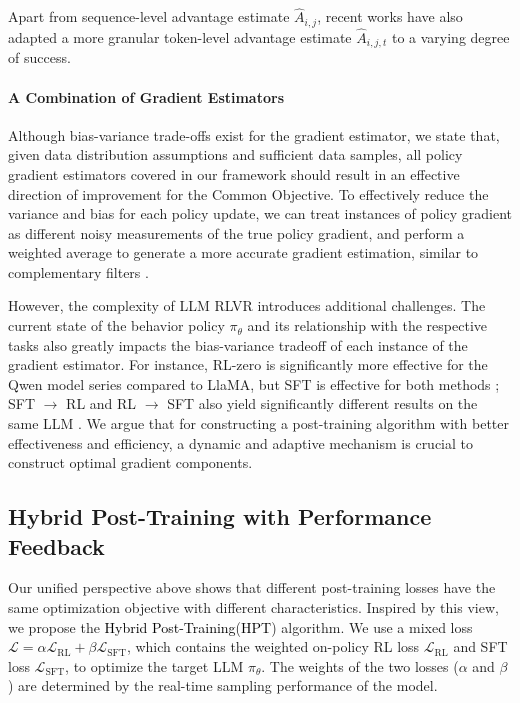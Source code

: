 \documentclass{article} %
\newcommand{\0}{\mathbb{0}}
\newcommand{\1}{\mathbb{1}}
\newcommand{\method}{\textcolor{black}{Hybrid Post-Training}\xspace}
\newcommand{\mot}{\textcolor{black}{HPT}\xspace}
\begin{document}
Apart from sequence-level advantage estimate $\hat{A}_{i,j}$, recent works \citep{wang2025beyond, yang2025treerpo, sun2025ktae} have also adapted a more granular token-level advantage estimate $\hat{A}_{i,j,t}$ to a varying degree of success. 



\paragraph{A Combination of Gradient Estimators}

Although bias-variance trade-offs exist for the gradient estimator, we state that, given data distribution assumptions and sufficient data samples, all policy gradient estimators covered in our framework should result in an effective direction of improvement for the Common Objective. 
To effectively reduce the variance and bias for each policy update, we can treat instances of policy gradient as different noisy measurements of the true policy gradient, and perform a weighted average to generate a more accurate gradient estimation, similar to complementary filters \citep{marantos2015uav}.


However, the complexity of LLM RLVR introduces additional challenges. The current state of the behavior policy $\pi_\theta$ and its relationship with the respective tasks also greatly impacts the bias-variance tradeoff of each instance of the gradient estimator.
For instance, RL-zero is significantly more effective for the Qwen model series compared to LlaMA, but SFT is effective for both methods \citep{zeng2025simplerlzooinvestigatingtamingzero}; SFT $\rightarrow$ RL and RL $\rightarrow$ SFT also yield significantly different results on the same LLM \citep{fu2025srft}.
We argue that for constructing a post-training algorithm with better effectiveness and efficiency, a dynamic and adaptive mechanism is crucial to construct optimal gradient components.









\subsection{Hybrid Post-Training with Performance Feedback}
\label{sec:method}


  

  



Our unified perspective above shows that different post-training losses have the same optimization objective with different characteristics.
Inspired by this view, we propose the \method (\mot) algorithm.
We use a mixed loss $\mathcal{L} = \alpha \mathcal{L}_{\mathrm{RL}} + \beta \mathcal{L}_{\mathrm{SFT}}$, which contains the weighted on-policy RL loss $\mathcal{L}_{\mathrm{RL}}$ and SFT loss $\mathcal{L}_{\mathrm{SFT}}$, to optimize the target LLM $\pi_\theta$. The weights of the two losses ($\alpha$ and $\beta$) are determined by the real-time sampling performance of the model.
\end{document}
